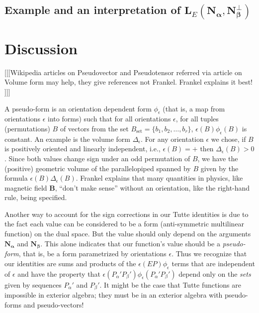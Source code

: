 \documentclass[Unicode]{cedram-alco}
\newcommand{\ext}[1]{\ensuremath{\mathbf{#1}}}
\begin{document}
\subsection{Example and an interpretation of $\ext{L}_E(\ext{N_\alpha},\ext{N_\beta^\perp})$}\label{ExamK4}






\section{Discussion}
[[[Wikipedia articles on Pseudovector and Pseudotensor
      referred via article on Volume form may help, they give references not  Frankel.
      Frankel explains it best! ]]]

A pseudo-form\cite[p 85-87]{Frankel} is an orientation dependent form $\phi_\epsilon$ (that is, a
map from orientations $\epsilon$ into forms) such that
for all orientations $\epsilon$, for all tuples (permutations) $B$ of vectors from the
set $B_{\text{set}}=\{b_1, b_2, \ldots, b_r\}$, $\epsilon(B)\phi_\epsilon(B)$
is constant. An example is the volume form $\Delta_\epsilon$.
For any orientation $\epsilon$ we chose,
if $B$ is positively oriented and linearly independent, i.e., $\epsilon(B)=+$
then $\Delta_\epsilon(B)>0$.  Since both values change sign under an odd permutation
of $B$, we have the (positive) geometric volume of the
parallelopiped spanned by $B$ given by the formula $\epsilon(B)\Delta_\epsilon(B)$.
Frankel explains that many quantities in physics, like magnetic field $\ext{B}$,
``don't make sense'' without
an orientation, like the right-hand rule,
being specified.


Another way to account for the sign corrections in our Tutte identities
is due to the fact each value can be considered to be a form (anti-symmetric
multilinear function) on the dual space. But the value should only depend
on the arguments $\ext{N_\alpha}$ and $\ext{N_\beta}$. This alone indicates
that our function's value should be a \emph{pseudo-form}, that is,
be a form parametrized by orientations $\epsilon$.  Thus we recognize that
our identities are sums and products of the $\epsilon(EP)\phi_\epsilon$ terms
that are independent of $\epsilon$ and have the property that
$\epsilon(P_\alpha'P_\beta')\phi_\epsilon(P_\alpha'P_\beta')$
depend only on the \emph{sets} given by sequences $P_\alpha'$ and $P_\beta'$.
It might be the case that Tutte functions are impossible in
exterior algebra; they must be in an exterior algebra with pseudo-forms
and pseudo-vectors!
\end{document}
